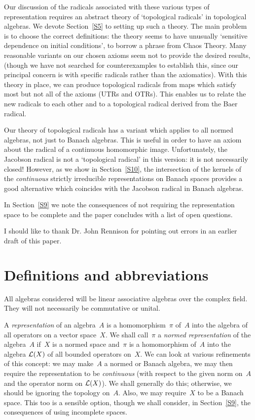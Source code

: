 \documentclass[11pt]{article}
\newcommand{\LX}{{\cal L}(X)}
\begin{document}
Our discussion of the radicals associated with these various types of
representation requires an abstract theory of `topological radicals'
in topological algebras.  We devote Section~\ref{S5} to setting up such a
theory.  The main problem is to choose the correct definitions: the theory seems
to have unusually `sensitive dependence on initial conditions', to borrow a
phrase from Chaos Theory.   Many reasonable variants on our chosen
axioms seem not to provide the desired results, (though we have not searched for
counterexamples to establish this, since our principal concern is with specific
radicals rather than the axiomatics).    With this theory in place, we can
produce topological radicals from maps which satisfy most but
not all of the axioms (UTRs and OTRs).   This enables us to relate the
new radicals to each other and to a topological radical derived from the Baer
radical.

Our theory of topological radicals has a variant which applies
to all normed algebras, not just to Banach algebras.  This is useful in order
to have an axiom about the radical of a continuous homomorphic image.
Unfortunately, the Jacobson radical is not a `topological radical' in this
version:  it is not necessarily closed!    However, as we show in
Section~\ref{S10}, the intersection of the kernels of the {\em continuous}
strictly irreducible representations on Banach spaces provides a good alternative
which coincides with the Jacobson radical in Banach algebras.

In Section~\ref{S9} we note the consequences of not requiring the representation
space to be complete and the paper concludes with a list of open questions.

I should like to thank Dr. John Rennison for pointing out errors in an earlier
draft of this paper.
\section{Definitions and abbreviations}\label{S2}

All algebras considered will be linear associative algebras over the complex
field.   They will not necessarily be commutative or unital.

A {\em representation} of an algebra~$A$ is a homomorphism~$\pi$ of~$A$ into the
algebra of all operators on a vector space~$X$.  We shall call~$\pi$ a {\em
normed representation} of the algebra~$A$ if~$X$ is a normed space and~$\pi$ is
a homomorphism of~$A$ into the algebra $\LX$ of all bounded operators on~$X$.
We can look at various refinements of this concept: we may make~$A$ a normed or
Banach algebra, we may then require the representation to be {\em continuous}
(with respect to the given norm on~$A$ and the operator norm on $\LX$).  We
shall generally do this; otherwise, we should be ignoring the topology on~$A$.
Also, we may require~$X$ to be a Banach space.   This too is a sensible option,
though we shall consider, in Section~\ref{S9}, the consequences of using
incomplete spaces.
\end{document}
